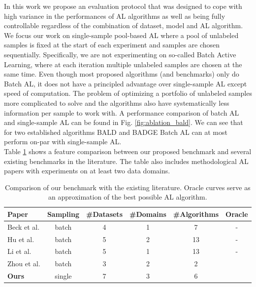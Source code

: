 \documentclass[]{article}
\begin{document}
In this work we propose an evaluation protocol that was designed to cope with high variance in the performances of AL algorithms as well as being fully controllable regardless of the combination of dataset, model and AL algorithm.\\
We focus our work on single-sample pool-based AL where a pool of unlabeled samples is fixed at the start of each experiment and samples are chosen sequentially.
Specifically, we are not experimenting on so-called Batch Active Learning, where at each iteration multiple unlabeled samples are chosen at the same time.
Even though most proposed algorithms (and benchmarks) only do Batch AL, it does not have a principled advantage over single-sample AL except speed of computation.
The problem of optimizing a portfolio of unlabeled samples more complicated to solve and the algorithms also have systematically less information per sample to work with.
A performance comparison of batch AL and single-sample AL can be found in Fig. \ref{fig:ablation_bald}.
We can see that for two established algorithms BALD \cite{krizhevsky2009learning} and BADGE \cite{ashdeep} Batch AL can at most perform on-par with single-sample AL. \\
Table \ref{tab:benchmark_comparison} shows a feature comparison between our proposed benchmark and several existing benchmarks in the literature.
The table also includes methodological AL papers with experiments on at least two data domains.
\begin{table}
	\centering
	\begin{tabular}{l | c c c c c}
		Paper & Sampling & \#Datasets & \#Domains & \#Algorithms & Oracle \\
		\hline
		Beck et al. \cite{beck2021effective} & batch & 4 & 1 & 7 & - \\
		Hu et al. \cite{hu2021towards} & batch & 5 & 2 & 13 & - \\
		Li et al. \cite{li2022empirical} & batch & 5 & 1 & 13 & - \\
		Zhou et al. \cite{zhou2021towards} & batch & 3 & 2 & 2 & \checkmark \\
		\textbf{Ours} & single & 7 & 3 & 6 & \checkmark 
	\end{tabular}
	\caption{Comparison of our benchmark with the existing literature. Oracle curves serve as an approximation of the best possible AL algorithm.}
	\label{tab:benchmark_comparison}
\end{table}
\end{document}
